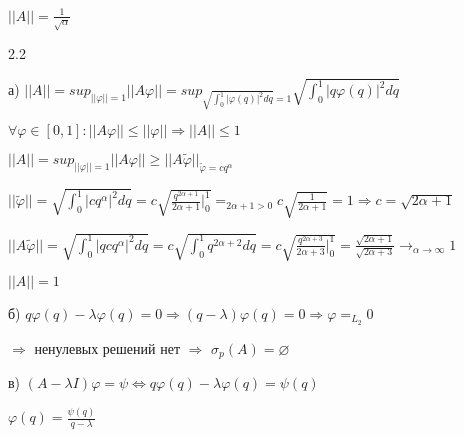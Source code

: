\documentclass[russian]{article}
\begin{document}
$ ||A|| = \frac{1}{\sqrt{\alpha}} $

2.2

а) $||A||=sup_{||\varphi||=1}||A\varphi||=sup_{\sqrt{\int_{0}^{1}|\varphi(q)|^{2}dq}=1}\sqrt{\int_{0}^{1}|q\varphi(q)|^{2}dq}$

$\forall\varphi\in[0,1]:||A\varphi||\le||\varphi||\Rightarrow||A||\le1$

$||A||=sup_{||\varphi||=1}||A\varphi||\ge||A\widetilde{\varphi}||_{\widetilde{\varphi}=cq^{\alpha}}$

$||\widetilde{\varphi}||=\sqrt{\int_{0}^{1}|cq^{\alpha}|^{2}dq}=c\sqrt{\frac{q^{2\alpha+1}}{2\alpha+1}|_{0}^{1}}=_{2\alpha+1>0}c\sqrt{\frac{1}{2\alpha+1}}=1\Rightarrow c=\sqrt{2\alpha+1}$

$||A\widetilde{\varphi}||=\sqrt{\int_{0}^{1}|qcq^{\alpha}|^{2}dq}=c\sqrt{\int_{0}^{1}q^{2\alpha+2}dq}=c\sqrt{\frac{q^{2\alpha+3}}{2\alpha+3}|_{0}^{1}}=\frac{\sqrt{2\alpha+1}}{\sqrt{2\alpha+3}}\rightarrow_{\alpha\rightarrow\infty}1$

$||A||=1$

б) $q\varphi(q)-\lambda\varphi(q)=0\Rightarrow(q-\lambda)\varphi(q)=0\Rightarrow\varphi=_{L_{2}}0$

$\Rightarrow$ ненулевых решений нет $\Rightarrow$ $\sigma_{p}(A)=\varnothing$

в) $(A-\lambda I)\varphi=\psi\Leftrightarrow q\varphi(q)-\lambda\varphi(q)=\psi(q)$

$\varphi(q)=\frac{\psi(q)}{q-\lambda}$
\end{document}
